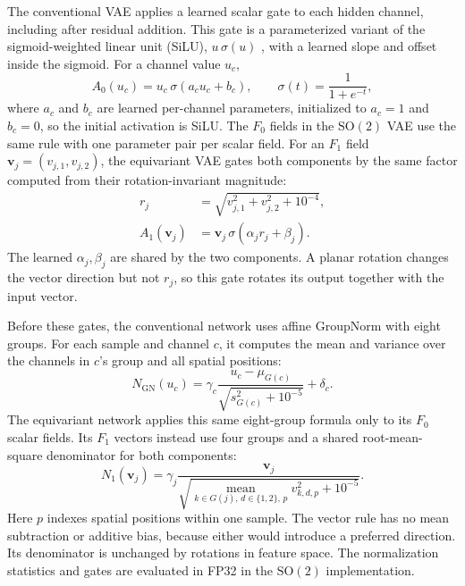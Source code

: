 \documentclass{midl}
\newcommand{\SOtwo}{\mathrm{SO}(2)}
\begin{document}
The conventional VAE applies a learned scalar gate to each hidden channel, including after residual addition. This gate is a parameterized variant of the sigmoid-weighted linear unit (SiLU), $u\,\sigma(u)$ \cite{elfwing_silu_2018}, with a learned slope and offset inside the sigmoid. For a channel value $u_c$,
\begin{equation}
A_0(u_c)=u_c\,\sigma(a_cu_c+b_c),\qquad
\sigma(t)=\frac{1}{1+e^{-t}},
\label{eq:scalar-gate}
\end{equation}
where $a_c$ and $b_c$ are learned per-channel parameters, initialized to $a_c=1$ and $b_c=0$, so the initial activation is SiLU. The $F_0$ fields in the $\SOtwo$ VAE use the same rule with one parameter pair per scalar field. For an $F_1$ field $\mathbf v_j=(v_{j,1},v_{j,2})$, the equivariant VAE gates both components by the same factor computed from their rotation-invariant magnitude:
\begin{equation}
\begin{aligned}
r_j&=\sqrt{v_{j,1}^{2}+v_{j,2}^{2}+10^{-4}},\\
A_1(\mathbf v_j)&=\mathbf v_j\,\sigma(\alpha_j r_j+\beta_j).
\end{aligned}
\label{eq:radial-gate}
\end{equation}
The learned $\alpha_j,\beta_j$ are shared by the two components. A planar rotation changes the vector direction but not $r_j$, so this gate rotates its output together with the input vector.

Before these gates, the conventional network uses affine GroupNorm with eight groups. For each sample and channel $c$, it computes the mean and variance over the channels in $c$'s group and all spatial positions:
\begin{equation}
N_{\mathrm{GN}}(u_c)=\gamma_c
\frac{u_c-\mu_{G(c)}}{\sqrt{s^2_{G(c)}+10^{-5}}}+\delta_c.
\label{eq:group-norm}
\end{equation}
The equivariant network applies this same eight-group formula only to its $F_0$ scalar fields. Its $F_1$ vectors instead use four groups and a shared root-mean-square denominator for both components:
\begin{equation}
N_1(\mathbf v_j)=\gamma_j
\frac{\mathbf v_j}{\sqrt{
\underset{k\in G(j),\,d\in\{1,2\},\,p}{\operatorname{mean}}
 v_{k,d,p}^{2}+10^{-5}}}.
\label{eq:vector-norm}
\end{equation}
Here $p$ indexes spatial positions within one sample. The vector rule has no mean subtraction or additive bias, because either would introduce a preferred direction. Its denominator is unchanged by rotations in feature space. The normalization statistics and gates are evaluated in FP32 in the $\SOtwo$ implementation.
\end{document}
